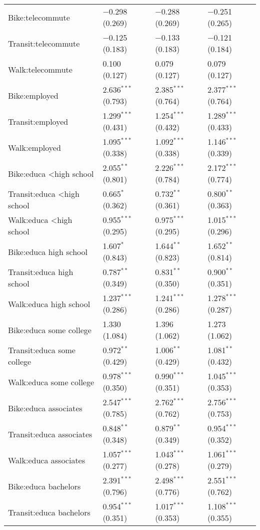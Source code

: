 \begin{longtabu}{llll}
  Bike:telecommute & $-$0.298 (0.269) & $-$0.288 (0.269) & $-$0.251 (0.265) \\ 
  Transit:telecommute & $-$0.125 (0.183) & $-$0.133 (0.183) & $-$0.121 (0.184) \\ 
  Walk:telecommute & 0.100 (0.127) & 0.079 (0.127) & 0.079 (0.127) \\ 
  Bike:employed & 2.636$^{***}$ (0.793) & 2.385$^{***}$ (0.764) & 2.377$^{***}$ (0.764) \\ 
  Transit:employed & 1.299$^{***}$ (0.431) & 1.254$^{***}$ (0.432) & 1.289$^{***}$ (0.433) \\ 
  Walk:employed & 1.095$^{***}$ (0.338) & 1.092$^{***}$ (0.338) & 1.146$^{***}$ (0.339) \\ 
  Bike:educa \textless high school & 2.055$^{**}$ (0.801) & 2.226$^{***}$ (0.784) & 2.172$^{***}$ (0.774) \\ 
  Transit:educa \textless high school & 0.665$^{*}$ (0.362) & 0.732$^{**}$ (0.361) & 0.800$^{**}$ (0.363) \\ 
  Walk:educa \textless high school & 0.955$^{***}$ (0.295) & 0.975$^{***}$ (0.295) & 1.015$^{***}$ (0.296) \\ 
  Bike:educa high school & 1.607$^{*}$ (0.843) & 1.644$^{**}$ (0.823) & 1.652$^{**}$ (0.814) \\ 
  Transit:educa high school & 0.787$^{**}$ (0.349) & 0.831$^{**}$ (0.350) & 0.900$^{**}$ (0.351) \\ 
  Walk:educa high school & 1.237$^{***}$ (0.286) & 1.241$^{***}$ (0.286) & 1.278$^{***}$ (0.287) \\ 
  Bike:educa some college & 1.330 (1.084) & 1.396 (1.062) & 1.273 (1.062) \\ 
  Transit:educa some college & 0.972$^{**}$ (0.429) & 1.006$^{**}$ (0.429) & 1.081$^{**}$ (0.432) \\ 
  Walk:educa some college & 0.978$^{***}$ (0.350) & 0.990$^{***}$ (0.351) & 1.045$^{***}$ (0.353) \\ 
  Bike:educa associates & 2.547$^{***}$ (0.785) & 2.762$^{***}$ (0.762) & 2.756$^{***}$ (0.753) \\ 
  Transit:educa associates & 0.848$^{**}$ (0.348) & 0.879$^{**}$ (0.349) & 0.954$^{***}$ (0.352) \\ 
  Walk:educa associates & 1.057$^{***}$ (0.277) & 1.043$^{***}$ (0.278) & 1.061$^{***}$ (0.279) \\ 
  Bike:educa bachelors & 2.391$^{***}$ (0.796) & 2.498$^{***}$ (0.776) & 2.551$^{***}$ (0.762) \\ 
  Transit:educa bachelors & 0.954$^{***}$ (0.351) & 1.017$^{***}$ (0.353) & 1.108$^{***}$ (0.355) \\ 

\end{longtabu}
